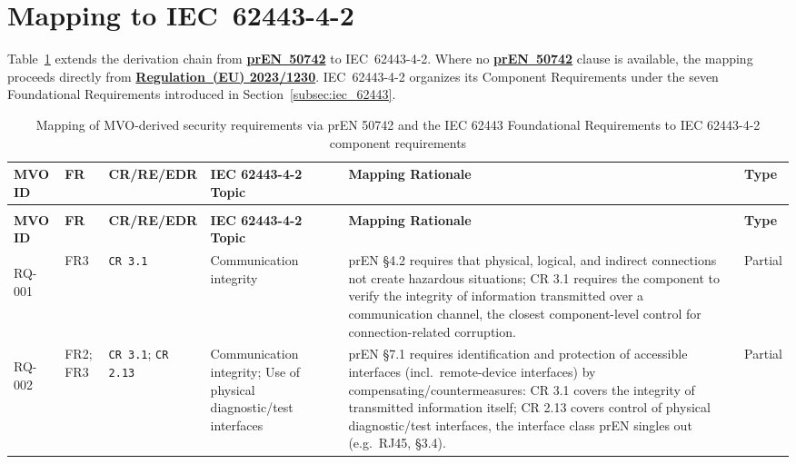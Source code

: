 \section{Mapping to IEC~62443-4-2}
\label{app:sec:mapping_iec62443}

Table~\ref{tab:mvo-pren-iec62443-mapping} extends the derivation chain from \hyperref[subsec:pren_50742]{\textbf{prEN~50742}}  to IEC~62443-4-2. Where no \hyperref[subsec:pren_50742]{\textbf{prEN~50742}}  clause is available, the mapping proceeds directly from \hyperref[subsec:eu_machinery_regulation]{\textbf{Regulation~(EU) 2023/1230}}. IEC~62443-4-2 organizes its Component Requirements under the seven Foundational Requirements introduced in Section~\ref{subsec:iec_62443}.


\footnotesize
\begin{longtable}{|>{\bfseries}p{1.0cm}|p{0.9cm}|p{2.4cm}|p{2.4cm}|p{4.8cm}|p{1.2cm}|}
	\caption{Mapping of MVO-derived security requirements via prEN 50742 and the IEC 62443 Foundational Requirements to IEC 62443-4-2 component requirements} \label{tab:mvo-pren-iec62443-mapping} \\
	\hline
	\textbf{MVO ID} & \textbf{FR} & \textbf{CR/RE/EDR} & \textbf{IEC 62443-4-2 Topic} & \textbf{Mapping Rationale} & \textbf{Type} \\
	\hline
	\endfirsthead
	
	\multicolumn{6}{c}{\tablename\ \thetable{} continued from previous page} \\
	\hline
	\textbf{MVO ID} & \textbf{FR} & \textbf{CR/RE/EDR} & \textbf{IEC 62443-4-2 Topic} & \textbf{Mapping Rationale} & \textbf{Type} \\
	\hline
	\endhead

	
	\hline
	\endlastfoot
	
	RQ-001 &
	FR3 &
	\texttt{CR 3.1} &
	Communication integrity &
	prEN \S4.2 requires that physical, logical, and indirect connections not create hazardous situations; CR 3.1 requires the component to verify the integrity of information transmitted over a communication channel, the closest component-level control for connection-related corruption. &
	Partial \\
	\hline
	
	RQ-002 &
	FR2; FR3 &
	\texttt{CR 3.1}; \newline \texttt{CR 2.13} &
	Communication integrity; Use of physical diagnostic/test interfaces &
	prEN \S7.1 requires identification and protection of accessible interfaces (incl.\ remote-device interfaces) by compensating/countermeasures: CR 3.1 covers the integrity of transmitted information itself; CR 2.13 covers control of physical diagnostic/test interfaces, the interface class prEN singles out (e.g.\ RJ45, \S3.4). &
	Partial \\
	\hline
	

\end{longtable}
